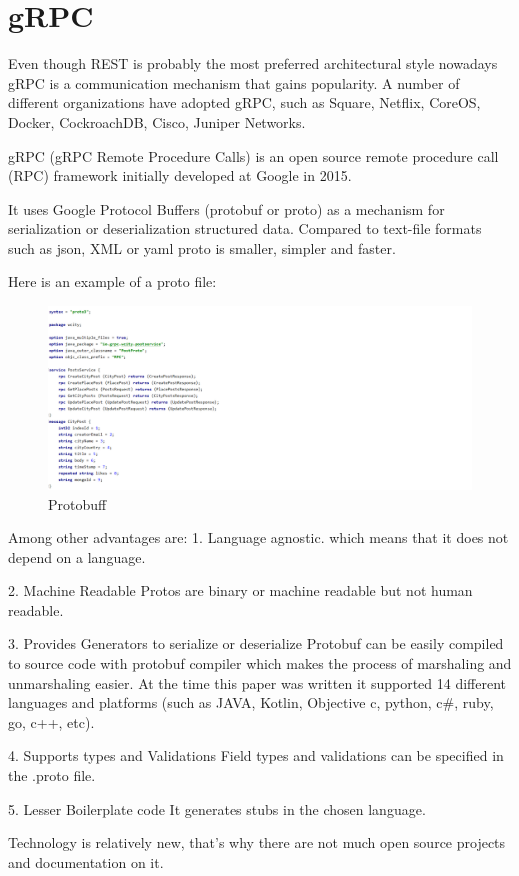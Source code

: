 \section{gRPC}
Even though REST is probably the most preferred architectural style nowadays gRPC is a communication mechanism that gains popularity.
A number of different organizations have adopted gRPC, such as Square, Netflix, CoreOS, Docker, CockroachDB, Cisco, Juniper Networks.

gRPC (gRPC Remote Procedure Calls) is an open source remote procedure call (RPC) framework initially developed at Google in 2015\cite{wang1993grpc}.

It uses Google Protocol Buffers (protobuf or proto) as a mechanism for serialization or deserialization structured data. Compared to text-file formats such as json, XML or yaml proto is smaller, simpler and faster. 

Here is an example of a proto file:
\begin{figure}[ht]
    \centering
    \includegraphics[width=2\textwidth]{img/proto.png}
     \caption{Protobuff}
    \label{fig:Protobuff}
\end{figure}

Among other advantages are:
1. Language agnostic.
which means that it does not depend on a language.

2. Machine Readable
 Protos are binary or machine readable but not human readable.
 
3. Provides Generators to serialize or deserialize
Protobuf can be easily compiled to source code with protobuf compiler which makes the process of marshaling and unmarshaling easier.
At the time this paper was written it supported 14 different languages and platforms (such as JAVA, Kotlin, Objective c, python, c\#, ruby, go, c++, etc). 

4. Supports types and Validations
Field types and validations can be specified in the .proto file.

5. Lesser Boilerplate code
It generates stubs in the chosen language.

Technology is relatively new, that's why there are not much open source projects and documentation on it.

